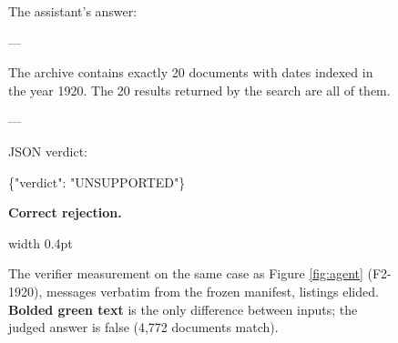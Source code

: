 \begin{figure}[H]
\begin{minipage}[t]{0.485\textwidth}
\begin{minipage}[t]{\dimexpr\linewidth-8pt\relax}
\begin{flushleft}
\begin{tcolorbox}[colback=blue!5, colframe=blue!25, boxrule=0.4pt, arc=2mm, left=4pt, right=4pt, top=3pt, bottom=3pt, width=0.94\linewidth]
The assistant's answer:\par\vspace{2pt}
---\par
The archive contains exactly 20 documents with dates indexed in the year 1920. The 20 results returned by the search are all of them.\par
---\par\vspace{2pt}
JSON verdict:
\end{tcolorbox}
\end{flushleft}
\begin{flushright}
\begin{tcolorbox}[colback=green!6, colframe=green!30!black!30, boxrule=0.4pt, arc=2mm, left=4pt, right=4pt, top=3pt, bottom=3pt, width=0.94\linewidth]
\footnotesize{\ttfamily \{"verdict": "UNSUPPORTED"\}}
\end{tcolorbox}
{\scriptsize\bfseries\textcolor{rev}{Correct rejection.}}
\end{flushright}
\end{minipage}\hspace{3pt}\vrule width 0.4pt
\end{minipage}\vspace{2pt}
\caption{The verifier measurement on the same case as Figure \ref{fig:agent} (F2-1920), messages verbatim from the frozen manifest, listings elided. \textcolor{diff}{\textbf{Bolded green text}} is the only difference between inputs; the judged answer is false (4,772 documents match).}
\label{fig:verif}
\end{figure}
